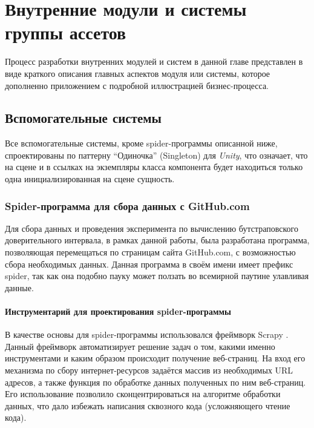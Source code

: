 \chapter{Внутренние модули и системы группы ассетов}
\label{cha:ch_2}

Процесс разработки внутренних модулей и систем в данной главе представлен в виде краткого описания главных аспектов модуля или системы, которое дополненно приложением с подробной иллюстрацией бизнес-процесса.

\section{Вспомогательные системы}
Все вспомогательные системы, кроме spider-программы описанной ниже, спроектированы по паттерну ``Одиночка'' (Singleton) для \textit{Unity}, что означает, что на сцене и в ссылках на экземпляры класса компонента будет находиться только одна инициализированная на сцене сущность.

\subsection{Spider-программа для сбора данных с GitHub.com}
Для сбора данных и проведения эксперимента по вычислению бутстраповского доверительного интервала, в рамках данной работы, была разработана программа, позволяющая перемещаться по страницам сайта GitHub.com, с возможностью сбора необходимых данных. Данная программа в своём имени имеет префикс spider, так как она подобно пауку может ползать во всемирной паутине улавливая данные.

\subsubsection*{Инструментарий для проектирования spider-программы}
В качестве основы для spider-программы использовался фреймворк Scrapy \cite{scrapy}. Данный фреймворк автоматизирует решение задач о том, какими именно инструментами и каким образом происходит получение веб-страниц. На вход его механизма по сбору интернет-ресурсов задаётся массив из необходимых URL адресов, а также функция по обработке данных полученных по ним веб-страниц. Его использование позволило сконцентрироваться на алгоритме обработки данных, что дало избежать написания сквозного кода (усложняющего чтение кода).

